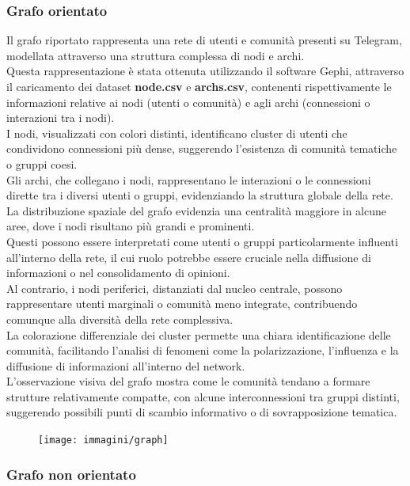 \documentclass[12pt]{article}
\begin{document}
	\subsubsection{Grafo orientato}
	Il grafo riportato rappresenta una rete di utenti e comunità presenti su Telegram, modellata attraverso una struttura complessa di nodi e archi. \\Questa rappresentazione è stata ottenuta utilizzando il software Gephi, attraverso il caricamento dei dataset \textbf{node.csv} e \textbf{archs.csv}, contenenti rispettivamente le informazioni relative ai nodi (utenti o comunità) e agli archi (connessioni o interazioni tra i nodi). \\I nodi, visualizzati con colori distinti, identificano cluster di utenti che condividono connessioni più dense, suggerendo l'esistenza di comunità tematiche o gruppi coesi. \\Gli archi, che collegano i nodi, rappresentano le interazioni o le connessioni dirette tra i diversi utenti o gruppi, evidenziando la struttura globale della rete.\\
	La distribuzione spaziale del grafo evidenzia una centralità maggiore in alcune aree, dove i nodi risultano più grandi e prominenti.\\ Questi possono essere interpretati come utenti o gruppi particolarmente influenti all'interno della rete, il cui ruolo potrebbe essere cruciale nella diffusione di informazioni o nel consolidamento di opinioni.\\ Al contrario, i nodi periferici, distanziati dal nucleo centrale, possono rappresentare utenti marginali o comunità meno integrate, contribuendo comunque alla diversità della rete complessiva.\\
	La colorazione differenziale dei cluster permette una chiara identificazione delle comunità, facilitando l'analisi di fenomeni come la polarizzazione, l'influenza e la diffusione di informazioni all'interno del network.\\ L'osservazione visiva del grafo mostra come le comunità tendano a formare strutture relativamente compatte, con alcune interconnessioni tra gruppi distinti, suggerendo possibili punti di scambio informativo o di sovrapposizione tematica.
	\begin{figure}[H]
		\centering
		\texttt{[image: immagini/graph]}
	\end{figure}
	\subsubsection{Grafo non orientato}
\end{document}
